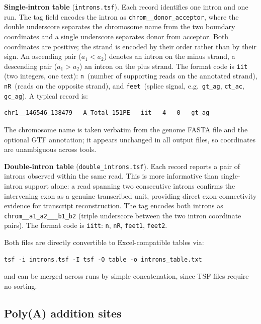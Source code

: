 \documentclass[11pt]{article}
\begin{document}
\textbf{Single-intron table} (\texttt{introns.tsf}).
Each record identifies one intron and one run.
The tag field encodes the intron as
\texttt{chrom\_\_donor\_acceptor}, where the double underscore
separates the chromosome name from the two boundary coordinates
and a single underscore separates donor from acceptor.
Both coordinates are positive; the strand is encoded by their order
rather than by their sign.
An ascending pair ($a_1 < a_2$) denotes an intron on the minus
strand, a descending pair ($a_1 > a_2$) an intron on the plus
strand.
The format code is \texttt{iit} (two integers, one text):
\texttt{n}~(number of supporting reads on the annotated strand),
\texttt{nR}~(reads on the opposite strand), and
\texttt{feet}~(splice signal, e.g.\ \texttt{gt\_ag},
\texttt{ct\_ac}, \texttt{gc\_ag}).
A typical record is:
\begin{lstlisting}
chr1__146546_138479   A_Total_151PE   iit   4   0   gt_ag
\end{lstlisting}
The chromosome name is taken verbatim from the genome FASTA file
and the optional GTF annotation; it appears unchanged in all
output files, so coordinates are unambiguous across tools.

\textbf{Double-intron table} (\texttt{double\_introns.tsf}).
Each record reports a pair of introns observed within the same
read.
This is more informative than single-intron support alone: a read
spanning two consecutive introns confirms the intervening exon as
a genuine transcribed unit, providing direct exon-connectivity
evidence for transcript reconstruction.
The tag encodes both introns as
\texttt{chrom\_\_a1\_a2\_\_\_b1\_b2} (triple underscore between
the two intron coordinate pairs).
The format code is \texttt{iitt}: \texttt{n}, \texttt{nR},
\texttt{feet1}, \texttt{feet2}.

Both files are directly convertible to Excel-compatible tables via:
\begin{lstlisting}
tsf -i introns.tsf -I tsf -O table -o introns_table.txt
\end{lstlisting}
and can be merged across runs by simple concatenation, since TSF
files require no sorting.

\subsection{Poly(A) addition sites}
\label{sec:polya_output}
\end{document}
